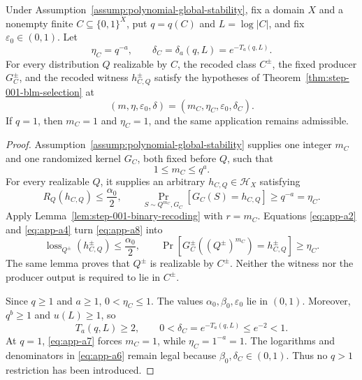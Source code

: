 \begin{lemma}\label{lem:step-001-blm-admissibility}
Under Assumption~\ref{assump:polynomial-global-stability}, fix a domain
\(X\) and a
nonempty finite \(C\subseteq\{0,1\}^X\), put \(q=q(C)\) and
\(L=\log|C|\), and fix \(\varepsilon_0\in(0,1)\).  Let
\[
\eta_C=q^{-a},\qquad
\delta_C=\delta_a(q,L)=e^{-T_a(q,L)}.
\]
For every distribution \(Q\) realizable by \(C\), the recoded class
\(C^\pm\), the fixed producer \(G_C^\pm\), and the recoded witness
\(h_{C,Q}^\pm\) satisfy the hypotheses of
Theorem~\ref{thm:step-001-blm-selection} at
\[
(m,\eta,\varepsilon_0,\delta)
=(m_C,\eta_C,\varepsilon_0,\delta_C).
\]
If \(q=1\), then \(m_C=1\) and \(\eta_C=1\), and the same application
remains admissible.
\end{lemma}

\begin{proof}
Assumption~\ref{assump:polynomial-global-stability} supplies one
integer \(m_C\) and one randomized kernel \(G_C\), both fixed before
\(Q\), such that
\begin{equation}
1\leq m_C\leq q^a.
\label{eq:app-a7}
\end{equation}
For every realizable \(Q\), it supplies an arbitrary
\(h_{C,Q}\in\mathcal H_X\) satisfying
\begin{equation}
R_Q(h_{C,Q})\leq\frac{\alpha_0}{2},
\qquad
\Pr_{S\sim Q^{m_C},G_C}[G_C(S)=h_{C,Q}]
\geq q^{-a}=\eta_C.
\label{eq:app-a8}
\end{equation}
Apply Lemma~\ref{lem:step-001-binary-recoding} with \(r=m_C\).
Equations \eqref{eq:app-a2} and \eqref{eq:app-a4} turn \eqref{eq:app-a8} into
\begin{equation}
\operatorname{loss}_{Q^\pm}(h_{C,Q}^\pm)
\leq\frac{\alpha_0}{2},
\qquad
\Pr[G_C^\pm((Q^\pm)^{m_C})=h_{C,Q}^\pm]
\geq\eta_C.
\label{eq:app-a9}
\end{equation}
The same lemma proves that \(Q^\pm\) is realizable by \(C^\pm\).
Neither the witness nor the producer output is required to lie in
\(C^\pm\).

Since \(q\geq1\) and \(a\geq1\), \(0<\eta_C\leq1\).
The values \(\alpha_0,\beta_0,\varepsilon_0\) lie in \((0,1)\).
Moreover, \(q^b\geq1\) and \(u(L)\geq1\), so
\begin{equation}
T_a(q,L)\geq2,\qquad
0<\delta_C=e^{-T_a(q,L)}\leq e^{-2}<1.
\label{eq:app-a10}
\end{equation}
At \(q=1\), \eqref{eq:app-a7} forces \(m_C=1\), while
\(\eta_C=1^{-a}=1\).  The logarithms and denominators in \eqref{eq:app-a6} remain
legal because \(\beta_0,\delta_C\in(0,1)\).  Thus no \(q>1\)
restriction has been introduced.
\end{proof}

